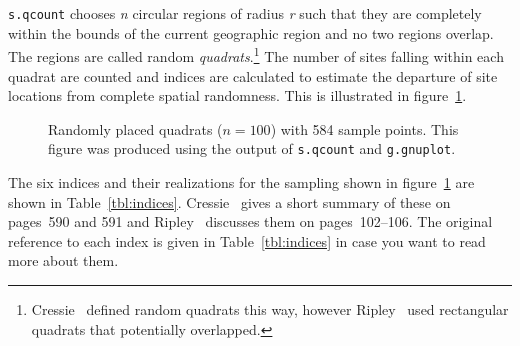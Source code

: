 {\tt s.qcount}
chooses {\em n\/} circular
regions of radius {\em r\/} such that they
are completely within the bounds of the current geographic
region and no two
regions overlap.
The regions are called random
{\em quadrats}.\footnote{Cressie~\protect\cite{cressie91} 
defined random quadrats this way, however Ripley~\protect\cite{ripley81}
used rectangular quadrats that potentially overlapped.}
The number of sites falling within each 
quadrat are counted and indices are calculated to estimate 
the departure of site locations from complete spatial 
randomness. This is illustrated in figure~\ref{fig:quads}.

\begin{figure}[h]
\begin{center}

\end{center}
\caption{Randomly placed quadrats ($n=100$) with 584 sample points. This figure
was produced using the output of {\tt s.qcount} and {\tt g.gnuplot}.}
\label{fig:quads}
\end{figure}

The six indices and their realizations for the sampling
shown in figure~\ref{fig:quads} are shown in Table~\ref{tbl:indices}.
Cressie~\cite{cressie91} gives a short summary of these on pages~590
and 591 and Ripley~\cite{ripley81} discusses them on pages~102--106.
The original reference to each index is given in Table~\ref{tbl:indices}
in case you want to read more about them.

